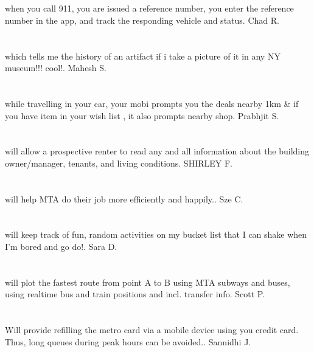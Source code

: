 \section{}when you call 911,  you are issued a reference number,  you enter the reference number in the app,  and track the responding vehicle and status. Chad R.
\section{}which tells me the history of an artifact if i take a picture of it in any NY museum!!! cool!. Mahesh S.
\section{}while travelling in your car,  your mobi prompts you the deals nearby 1km \& if you have item in your wish list , it also prompts nearby shop. Prabhjit S.
\section{}will allow a prospective renter to read any and all information about the building owner/manager,  tenants, and living conditions. SHIRLEY F.
\section{}will help MTA do their job more efficiently and happily.. Sze C.
\section{}will keep track of fun,  random activities on my bucket list that I can shake when I'm bored and go do!. Sara D.
\section{}will plot the fastest route from point A to B using MTA subways and buses,  using realtime bus and train positions and incl. transfer info. Scott P.
\section{}Will provide refilling the metro card via a mobile device using you credit card. Thus,  long queues during peak hours can be avoided.. Sannidhi J.
